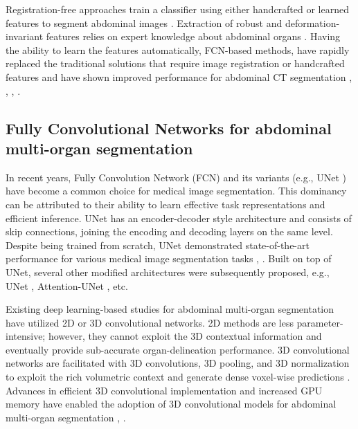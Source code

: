 \documentclass[final,5p,times,twocolumn]{elsarticle}
\begin{document}
Registration-free approaches train a classifier using either handcrafted or learned features to segment abdominal images \cite{campadelli2009automatic}. Extraction of robust and deformation-invariant features relies on expert knowledge about abdominal organs \cite{lombaert2014laplacian}. Having the ability to learn the features automatically, FCN-based methods, have rapidly replaced the traditional solutions that require image registration or handcrafted features and have shown improved performance for abdominal CT segmentation \cite{gibson2018automatic}, \cite{bobo2018fully}, \cite{sinha2020multi}, \cite{peng2019method}. 
\subsection{Fully Convolutional Networks for abdominal multi-organ segmentation}\label{sec:dnns}
In recent years, Fully Convolution Network (FCN) and its variants (e.g., UNet \cite{ronneberger2015u}) have become a common choice for medical image segmentation. This dominancy can be attributed to their ability to learn effective task representations and efficient inference. UNet has an encoder-decoder style architecture and consists of skip connections, joining the encoding and decoding layers on the same level. Despite being trained from scratch, UNet demonstrated state-of-the-art performance for various medical image segmentation tasks \cite{chen2017rbnet}, \cite{Dong2017AutomaticBT}. Built on top of UNet, several other modified architectures were subsequently proposed, e.g., UNet \cite{zhou2019unet++}, Attention-UNet \cite{schlemper2019attention}, etc. 

Existing deep learning-based studies for abdominal multi-organ segmentation have utilized 2D or 3D convolutional networks. 2D methods are less parameter-intensive; however, they cannot exploit the 3D contextual information and eventually provide sub-accurate organ-delineation performance. 3D convolutional networks are facilitated with 3D convolutions, 3D pooling, and 3D normalization to exploit the rich volumetric context and generate dense voxel-wise predictions \cite{cciccek20163d}. Advances in efficient 3D convolutional implementation and increased GPU memory have enabled the adoption of 3D convolutional models for abdominal multi-organ segmentation \cite{Zhang2020BlockLS}, \cite{hu2017automatic}.
\end{document}
